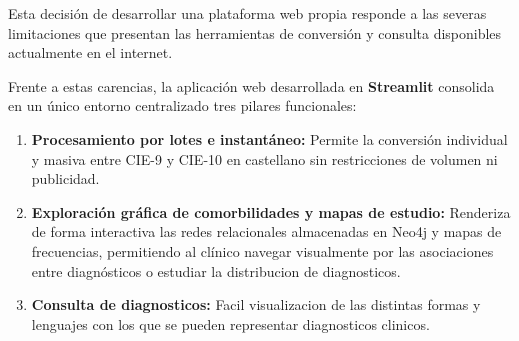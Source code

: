 \documentclass[12pt,a4paper,onecolumn,oneside]{report}
\begin{document}
Esta decisión de desarrollar una plataforma web propia responde  a las severas limitaciones que presentan las herramientas de conversión y consulta disponibles actualmente en el internet.

Frente a estas carencias, la aplicación web desarrollada en \textbf{Streamlit} consolida en un único entorno centralizado tres pilares funcionales:
\begin{enumerate}
    \item \textbf{Procesamiento por lotes e instantáneo:} Permite la conversión individual y masiva entre CIE-9 y CIE-10 en castellano sin restricciones de volumen ni publicidad.
    \item \textbf{Exploración gráfica de comorbilidades y mapas de estudio:} Renderiza de forma interactiva las redes relacionales almacenadas en Neo4j y mapas de frecuencias, permitiendo al clínico navegar visualmente por las asociaciones entre diagnósticos o estudiar la distribucion de diagnosticos.
    \item \textbf{Consulta de diagnosticos:} Facil visualizacion de las distintas formas y lenguajes con los que se pueden representar diagnosticos clinicos.
\end{enumerate}
\end{document}
